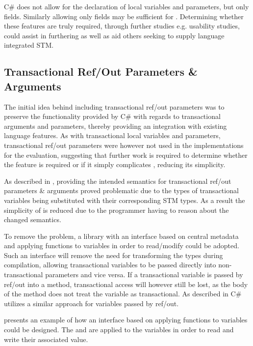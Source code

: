 C\# does not allow for the declaration of  local variables and parameters, but only  fields. Similarly allowing only  fields may be sufficient for \stmname. Determining whether these features are truly required, through further studies e.g. usability studies, could assist in furthering \stmname as well as aid others seeking to supply language integrated \ac{STM}.


\subsection{Transactional Ref/Out Parameters \& Arguments}\label{subse:reflection_ref_out}
The initial idea behind including transactional ref/out parameters was to preserve the functionality provided by C\# with regards to transactional arguments and parameters, thereby providing an integration with existing language features. As with transactional local variables and parameters, transactional ref/out parameters were however not used in the implementations for the evaluation, suggesting that further work is required to determine whether the feature is required or if it simply complicates \stmname, reducing its simplicity.

As described in , providing the intended semantics for transactional ref/out parameters \& arguments proved problematic due to the types of transactional variables being substituted with their corresponding \ac{STM} types. As a result the simplicity of \stmname is reduced due to the programmer having to reason about the changed semantics.

To remove the problem, a library with an interface based on central metadata and applying functions to variables in order to read/modify could be adopted. Such an interface will remove the need for transforming the types during compilation, allowing transactional variables to be passed directly into non-transactional parameters and vice versa. If a transactional variable is passed by ref/out into a method, transactional access will however still be lost, as the body of the method does not treat the variable as transactional. As described in  C\# utilizes a similar approach for  variables passed by ref/out.

 presents an example of how an  interface based on applying functions to variables could be designed. The  and  are applied to the  variables in order to read and write their associated value.

